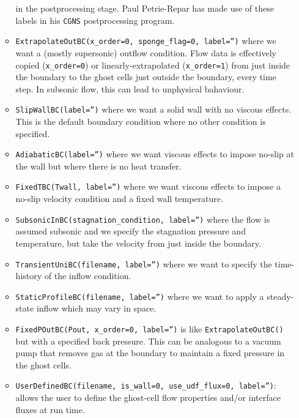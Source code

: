 \documentclass[12pt,a4paper,twoside]{article}
\begin{document}
\begin{itemize}
\begin{itemize}
      in the postprocessing stage.
      Paul Petrie-Repar has made use of these labels in his \texttt{CGNS} postprocessing program.
    \item \texttt{ExtrapolateOutBC(x\_order=0, sponge\_flag=0, label='')} where we want a (mostly supersonic) outflow
      condition.
      Flow data is effectively copied (\texttt{x\_order=0}) or linearly-extrapolated (\texttt{x\_order=1})
      from just inside the boundary to the ghost cells just outside the boundary, every time step.
      In subsonic flow, this can lead to unphysical bahaviour.
    \item \texttt{SlipWallBC(label='')} where we want a solid wall with no viscous effects.
      This is the default boundary condition where no other condition is specified.
    \item \texttt{AdiabaticBC(label='')} where we want viscous effects to impose no-slip at the wall
      but where there is no heat transfer.
    \item \texttt{FixedTBC(Twall, label='')} where we want viscous effects to impose a no-slip velocity 
      condition and a fixed wall temperature.
    \item \texttt{SubsonicInBC(stagnation\_condition, label='')} where the flow is assumed subsonic and
      we specify the stagnation pressure and temperature, but take the velocity from just inside
      the boundary.
    \item \texttt{TransientUniBC(filename, label='')} where we want to specify the time-history of
      the inflow condition.
    \item \texttt{StaticProfileBC(filename, label='')} where we want to apply a steady-state inflow
       which may vary in space.
    \item \texttt{FixedPOutBC(Pout, x\_order=0, label='')} 
      is like \texttt{ExtrapolateOutBC()} but with a specified back pressure.
      This can be analogous to a vacuum pump that removes gas at the boundary to maintain
      a fixed pressure in the ghost cells.
    \item \texttt{UserDefinedBC(filename, is\_wall=0, use\_udf\_flux=0, label='')}: 
       allows the user to define the ghost-cell flow properties and/or interface fluxes at run time.

\end{itemize}
\end{itemize}
\end{document}
